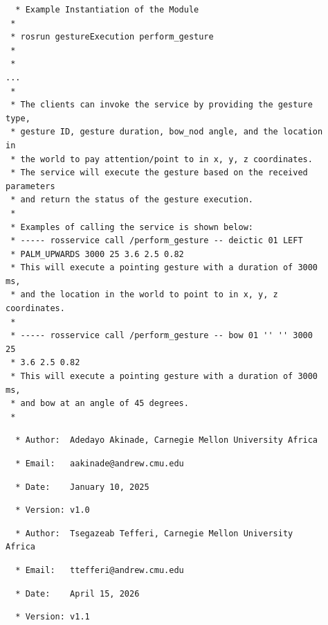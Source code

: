 \documentclass{CSSRforAfrica}
\newcommand{\checkboxChecked}{\fbox{\ding{51}}} %
\begin{document}
\begin{description}
\item[\checkboxChecked] 
 {\small 
\begin{verbatim}
  * Example Instantiation of the Module
 *
 * rosrun gestureExecution perform_gesture
 *
 *
...
 *
 * The clients can invoke the service by providing the gesture type,
 * gesture ID, gesture duration, bow_nod angle, and the location in
 * the world to pay attention/point to in x, y, z coordinates.
 * The service will execute the gesture based on the received parameters
 * and return the status of the gesture execution.
 *
 * Examples of calling the service is shown below:
 * ----- rosservice call /perform_gesture -- deictic 01 LEFT
 * PALM_UPWARDS 3000 25 3.6 2.5 0.82
 * This will execute a pointing gesture with a duration of 3000 ms,
 * and the location in the world to point to in x, y, z coordinates.
 *
 * ----- rosservice call /perform_gesture -- bow 01 '' '' 3000 25
 * 3.6 2.5 0.82
 * This will execute a pointing gesture with a duration of 3000 ms,
 * and bow at an angle of 45 degrees.
 *
\end{verbatim}}

\item[\checkboxChecked] 
 {\small 
\begin{verbatim}
  * Author:  Adedayo Akinade, Carnegie Mellon University Africa
\end{verbatim}}

\item[\checkboxChecked] 
 {\small 
\begin{verbatim}
  * Email:   aakinade@andrew.cmu.edu
\end{verbatim}}

\item[\checkboxChecked] 
 {\small 
\begin{verbatim}
  * Date:    January 10, 2025
\end{verbatim}}

\item[\checkboxChecked] 
 {\small 
\begin{verbatim}
  * Version: v1.0
\end{verbatim}}
\item[\checkboxChecked] 
 {\small 
\begin{verbatim}
  * Author:  Tsegazeab Tefferi, Carnegie Mellon University Africa
\end{verbatim}}

\item[\checkboxChecked] 
 {\small 
\begin{verbatim}
  * Email:   ttefferi@andrew.cmu.edu
\end{verbatim}}

\item[\checkboxChecked] 
 {\small 
\begin{verbatim}
  * Date:    April 15, 2026
\end{verbatim}}

\item[\checkboxChecked] 
 {\small 
\begin{verbatim}
  * Version: v1.1
\end{verbatim}}

\end{description}
\end{document}
